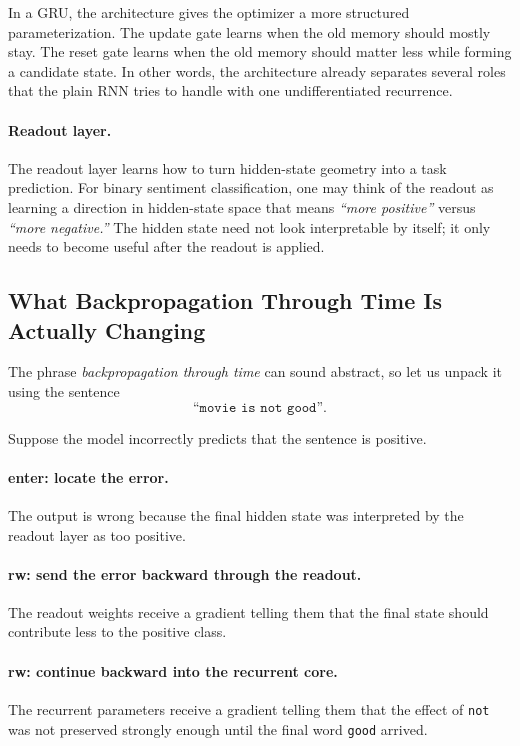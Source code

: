 \documentclass[12pt,a4paper]{article}
\begin{document}
In a GRU, the architecture gives the optimizer a more structured parameterization. The update gate learns when the old memory should mostly stay. The reset gate learns when the old memory should matter less while forming a candidate state. In other words, the architecture already separates several roles that the plain RNN tries to handle with one undifferentiated recurrence.

\paragraph{Readout layer.}
The readout layer learns how to turn hidden-state geometry into a task prediction. For binary sentiment classification, one may think of the readout as learning a direction in hidden-state space that means
\emph{``more positive''}
versus
\emph{``more negative.''}
The hidden state need not look interpretable by itself; it only needs to become useful after the readout is applied.

\subsection{What Backpropagation Through Time Is Actually Changing}

The phrase \emph{backpropagation through time} can sound abstract, so let us unpack it using the sentence
\[
\texttt{``movie is not good''}.
\]

Suppose the model incorrectly predicts that the sentence is positive.

\paragraph{enter: locate the error.}
The output is wrong because the final hidden state was interpreted by the readout layer as too positive.

\paragraph{rw: send the error backward through the readout.}
The readout weights receive a gradient telling them that the final state should contribute less to the positive class.

\paragraph{rw: continue backward into the recurrent core.}
The recurrent parameters receive a gradient telling them that the effect of \texttt{not} was not preserved strongly enough until the final word \texttt{good} arrived.
\end{document}
